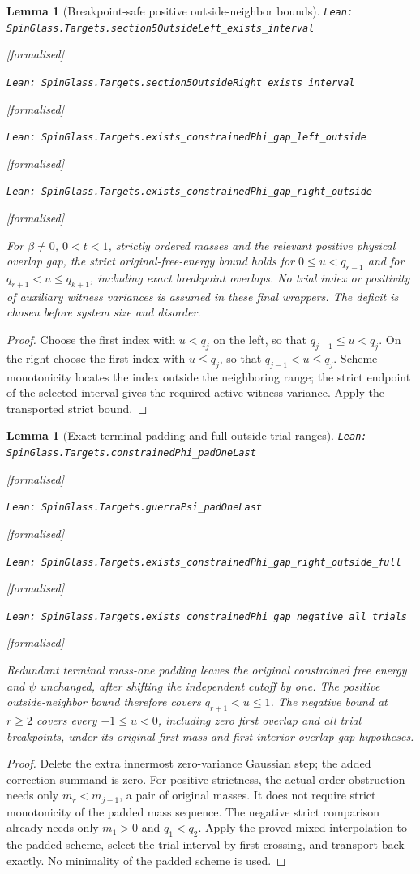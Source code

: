 \documentclass[11pt]{article}
\providecommand{\lean}[1]{\leavevmode\par\nopagebreak
  {\noindent\normalfont\footnotesize\raggedright\texttt{Lean: #1}\par}\nopagebreak}
\providecommand{\leanok}{\par\nopagebreak
  {\noindent\normalfont\footnotesize\textcolor{green!50!black}{[formalised]}\par}\nopagebreak}
\newtheorem{lemma}[theorem]{Lemma}
\begin{document}
\begin{lemma}[Breakpoint-safe positive outside-neighbor bounds]
\lean{SpinGlass.Targets.section5OutsideLeft\_exists\_interval}\leanok
\lean{SpinGlass.Targets.section5OutsideRight\_exists\_interval}\leanok
\lean{SpinGlass.Targets.exists\_constrainedPhi\_gap\_left\_outside}\leanok
\lean{SpinGlass.Targets.exists\_constrainedPhi\_gap\_right\_outside}\leanok
For $\beta\ne0$, $0<t<1$, strictly ordered masses and the relevant
positive physical overlap gap, the strict original-free-energy bound holds
for $0\le u<q_{r-1}$ and for $q_{r+1}<u\le q_{k+1}$, including exact
breakpoint overlaps. No trial index or positivity of auxiliary witness
variances is assumed in these final wrappers. The deficit is chosen before
system size and disorder.
\end{lemma}
\begin{proof}
Choose the first index with $u<q_j$ on the left, so that
$q_{j-1}\le u<q_j$. On the right choose the first index with $u\le q_j$,
so that $q_{j-1}<u\le q_j$. Scheme monotonicity locates the index outside
the neighboring range; the strict endpoint of the selected interval gives
the required active witness variance. Apply the transported strict bound.
\end{proof}

\begin{lemma}[Exact terminal padding and full outside trial ranges]
\lean{SpinGlass.Targets.constrainedPhi\_padOneLast}\leanok
\lean{SpinGlass.Targets.guerraPsi\_padOneLast}\leanok
\lean{SpinGlass.Targets.exists\_constrainedPhi\_gap\_right\_outside\_full}\leanok
\lean{SpinGlass.Targets.exists\_constrainedPhi\_gap\_negative\_all\_trials}\leanok
Redundant terminal mass-one padding leaves the original constrained free
energy and $\psi$ unchanged, after shifting the independent cutoff by one.
The positive outside-neighbor bound therefore covers
$q_{r+1}<u\le1$. The negative bound at $r\ge2$ covers every
$-1\le u<0$, including zero first overlap and all trial breakpoints,
under its original first-mass and first-interior-overlap gap hypotheses.
\end{lemma}
\begin{proof}
Delete the extra innermost zero-variance Gaussian step; the added correction
summand is zero. For positive strictness, the actual order obstruction needs
only $m_r<m_{j-1}$, a pair of original masses. It does not require strict
monotonicity of the padded mass sequence. The negative strict comparison
already needs only $m_1>0$ and $q_1<q_2$. Apply the proved mixed interpolation
to the padded scheme, select the trial interval by first crossing, and
transport back exactly. No minimality of the padded scheme is used.
\end{proof}
\end{document}

